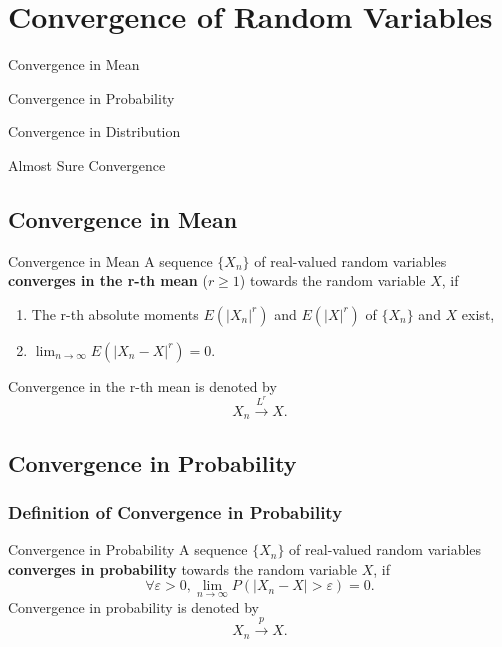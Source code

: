 \chapter{Convergence of Random Variables}

\begin{introduction}
    \item Convergence in Mean
    \item Convergence in Probability
    \item Convergence in Distribution
    \item Almost Sure Convergence
\end{introduction}

\section{Convergence in Mean}

\begin{definition}{Convergence in Mean}{}
    A sequence $\{X_n\}$ of real-valued random variables \textbf{converges in the r-th mean} ($r\geq1$) towards the random variable $X$, if
    \begin{enumerate}
        \item The r-th absolute moments $E(|X_n|^r)$ and $E(|X|^r)$ of $\{X_n\}$ and $X$ exist,
        \item $\lim_{n\to\infty}E\left(|X_n-X|^r\right)=0$.
    \end{enumerate}
    Convergence in the r-th mean is denoted by
    \begin{equation}
        X_n \stackrel{L^r}{\rightarrow} X.
    \end{equation}
\end{definition}

\section{Convergence in Probability}

\subsection{Definition of Convergence in Probability}

\begin{definition}{Convergence in Probability}{}
    A sequence $\{X_n\}$ of real-valued random variables \textbf{converges in probability} towards the random variable $X$, if
    \begin{equation}
        \forall \varepsilon > 0, \lim_{n\to\infty}P\left(|X_n-X|>\varepsilon\right)=0.
    \end{equation}
    Convergence in probability is denoted by
    \begin{equation}
        X_n \stackrel{p}{\rightarrow} X.
    \end{equation}
\end{definition}

